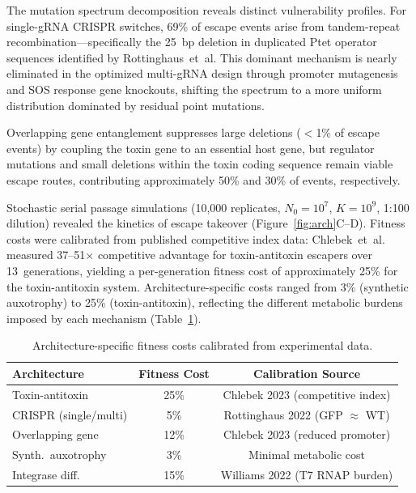 \documentclass[journal=asbcd6,manuscript=article]{achemso}
\begin{document}
The mutation spectrum decomposition reveals distinct vulnerability profiles. For single-gRNA CRISPR switches, 69\% of escape events arise from tandem-repeat recombination---specifically the 25~bp deletion in duplicated Ptet operator sequences identified by Rottinghaus~et~al.\cite{Rottinghaus2022} This dominant mechanism is nearly eliminated in the optimized multi-gRNA design through promoter mutagenesis and SOS response gene knockouts, shifting the spectrum to a more uniform distribution dominated by residual point mutations.

Overlapping gene entanglement\cite{Chlebek2023} suppresses large deletions ($<$1\% of escape events) by coupling the toxin gene to an essential host gene, but regulator mutations and small deletions within the toxin coding sequence remain viable escape routes, contributing approximately 50\% and 30\% of events, respectively.

Stochastic serial passage simulations (10,000 replicates, $N_0 = 10^7$, $K = 10^9$, 1:100 dilution) revealed the kinetics of escape takeover (Figure~\ref{fig:arch}C--D). Fitness costs were calibrated from published competitive index data: Chlebek~et~al.\cite{Chlebek2023} measured 37--51$\times$ competitive advantage for toxin-antitoxin escapers over 13~generations, yielding a per-generation fitness cost of approximately 25\% for the toxin-antitoxin system. Architecture-specific costs ranged from 3\% (synthetic auxotrophy) to 25\% (toxin-antitoxin), reflecting the different metabolic burdens imposed by each mechanism (Table~\ref{tab:fitness}).

\begin{table}[h]
\caption{Architecture-specific fitness costs calibrated from experimental data.}
\label{tab:fitness}
\centering
\begin{tabular}{lcc}
\toprule
Architecture & Fitness Cost & Calibration Source \\
\midrule
Toxin-antitoxin & 25\% & Chlebek 2023 (competitive index) \\
CRISPR (single/multi) & 5\% & Rottinghaus 2022 (GFP $\approx$ WT) \\
Overlapping gene & 12\% & Chlebek 2023 (reduced promoter) \\
Synth.\ auxotrophy & 3\% & Minimal metabolic cost \\
Integrase diff. & 15\% & Williams 2022 (T7 RNAP burden) \\
\bottomrule
\end{tabular}
\end{table}
\end{document}
